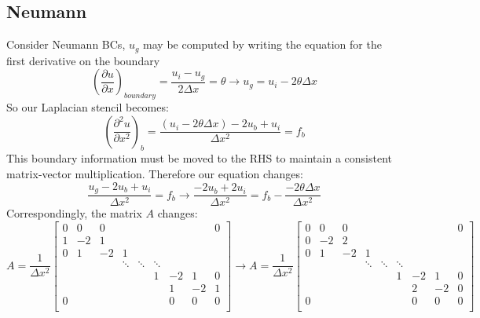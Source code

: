 \documentclass[landscape]{article}
\begin{document}
\subsection{Neumann}
Consider Neumann BCs, $u_g$ may be computed by writing the equation for the first derivative on the boundary
\begin{equation}
  \left(\frac{\partial u}{\partial x}\right)_{boundary}
  = \frac{u_i - u_g}{2\Delta x} = \theta
  \rightarrow
  u_g = u_i - 2\theta \Delta x
\end{equation}
So our Laplacian stencil becomes:
\begin{equation}
   \left(\frac{\partial^2 u}{\partial x^2}\right)_{b} = 
   \frac{(u_i - 2\theta \Delta x) - 2 u_b + u_i}{\Delta x^2} = f_b
\end{equation}
This boundary information must be moved to the RHS to maintain a consistent matrix-vector multiplication. Therefore our equation changes:
\begin{equation}
   \frac{u_g - 2 u_b + u_i}{\Delta x^2} = f_b
   \rightarrow
   \frac{- 2u_b + 2u_i}{\Delta x^2} = f_b - \frac{-2\theta \Delta x}{\Delta x^2}
\end{equation}
Correspondingly, the matrix $A$ changes:
\[ A = \frac{1}{\Delta x^2} \left[\begin{array}{ccccccccc}
0  & 0     & 0         &           &           &           &           &         &  0 \\
1  & -2    & 1         &           &           &           &           &         &    \\
0  & 1     & -2        & 1         &           &           &           &         &    \\
   &       &           & \ddots    & \ddots    & \ddots    &           &         &    \\
   &       &           &           &           & 1         & -2        & 1       &  0 \\
   &       &           &           &           &           &  1        & -2      &  1 \\
0  &       &           &           &           &           &  0        & 0       &  0 \\
\end{array} \right]
\rightarrow
A = \frac{1}{\Delta x^2} \left[\begin{array}{ccccccccc}
0  & 0     & 0         &           &           &           &           &         &  0 \\
0  & -2    & 2         &           &           &           &           &         &    \\
0  & 1     & -2        & 1         &           &           &           &         &    \\
   &       &           & \ddots    & \ddots    & \ddots    &           &         &    \\
   &       &           &           &           & 1         & -2        & 1       &  0 \\
   &       &           &           &           &           &  2        & -2      &  0 \\
0  &       &           &           &           &           &  0        & 0       &  0 \\
\end{array} \right]
\]
\end{document}
